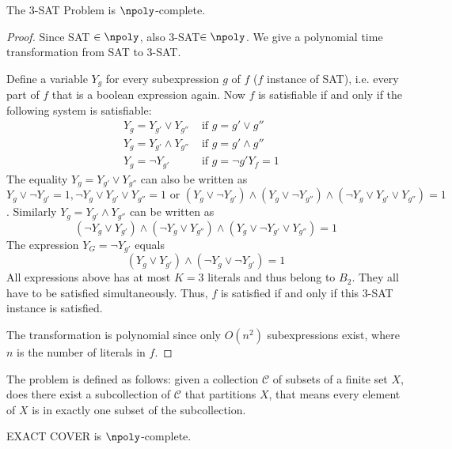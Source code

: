 \begin{cor}
The 3-SAT Problem is $\npoly$-complete.
\end{cor}
\begin{proof}
	Since SAT $\in \npoly$, also 3-SAT$\in \npoly$. We give a polynomial time transformation from SAT to 3-SAT.
	
Define a variable $Y_g$ for every subexpression $g$ of $f$ ($f$ instance of SAT), i.e. every part of $f$ that is a boolean expression again.
Now $f$ is satisfiable if and only if the following system is satisfiable: 
\begin{align*}
	Y_g = Y_{g'} \vee Y_{g''} & \text{ if } g = g' \vee g'' \\
	Y_g = Y_{g'} \wedge Y_{g''}& \text{ if } g = g' \wedge g'' \\
	Y_g = \neg Y_{g'}& \text{ if } g = \neg g'
	Y_f = 1 &
\end{align*}
The equality $Y_g = Y_{g'} \vee Y_{g''}$ can also be written as 
\[
	Y_{g} \vee \neg Y_{g'} = 1, \neg Y_g \vee Y_{g'} \vee Y_{g''} = 1 \text{ or } (Y_g\vee\neg Y_{g'})\wedge(Y_g\vee \neg Y_{g''}) \wedge(\neg Y_g \vee Y_{g'} \vee Y_{g''}) = 1 \]. Similarly $Y_g=Y_{g'}\wedge Y_{g''}$ can be written as \[
	(\neg Y_g \vee Y_{g'}) \wedge (\neg Y_g \vee Y_{g''}) \wedge (Y_g \vee \neg Y_{g'} \vee Y_{g''}) = 1
\]
The expression $Y_G = \neg Y_{g'}$ equals \[
	(Y_g \vee Y_{g'}) \wedge (\neg Y_g \vee \neg Y_{g'}) = 1
\]
All expressions above has at most $K=3$ literals and thus belong to $B_2$. They all have to be satisfied simultaneously. Thus, $f$ is satisfied if and only if this 3-SAT instance is satisfied.

The transformation is polynomial since only $O(n^2)$ subexpressions exist, where $n$ is the number of literals in $f$.
\end{proof}

\begin{defn}
	The  problem is defined as follows: given a collection $\mathcal C$ of subsets of a finite set $X$, does there exist a subcollection of $\mathcal C$ that partitions $X$, that means every element of $X$ is in exactly one subset of the subcollection.
\end{defn}

\begin{thm}
	EXACT COVER is $\npoly$-complete.
\end{thm}

